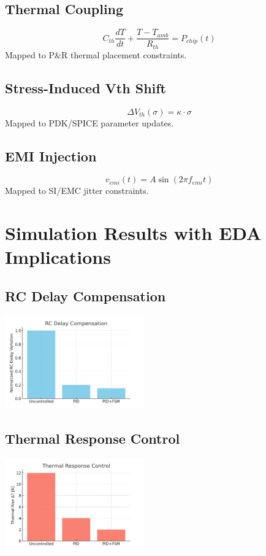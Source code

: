 \documentclass[conference]{IEEEtran}
\begin{document}
\subsection{Thermal Coupling}
\[
C_{th}\frac{dT}{dt} + \frac{T-T_{amb}}{R_{th}} = P_{chip}(t)
\]
Mapped to P\&R thermal placement constraints.

\subsection{Stress-Induced Vth Shift}
\[
\Delta V_{th}(\sigma)=\kappa \cdot \sigma
\]
Mapped to PDK/SPICE parameter updates.

\subsection{EMI Injection}
\[
v_{emi}(t)=A\sin(2\pi f_{emi} t)
\]
Mapped to SI/EMC jitter constraints.

\section{Simulation Results with EDA Implications}
\subsection{RC Delay Compensation}
\includegraphics[width=0.45\textwidth]{sim_delay_rc.png}

\subsection{Thermal Response Control}
\includegraphics[width=0.45\textwidth]{sim_thermal_response.png}
\end{document}
